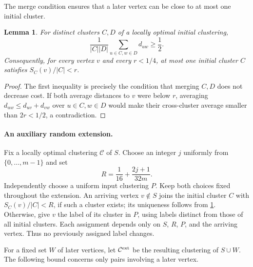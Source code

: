 \documentclass[11pt]{article}
\newtheorem{lemma}[theorem]{Lemma}
\begin{document}
The merge condition ensures that a later vertex can be close to at
most one initial cluster.

\begin{lemma}
\label{seedext:merge}
For distinct clusters $C,D$ of a locally optimal initial clustering,
\[
 \frac1{|C||D|}\sum_{u\in C,w\in D}d_{uw}\ge\frac12.
\]
Consequently, for every vertex $v$ and every $r<1/4$, at most one
initial cluster $C$ satisfies $S_C(v)/|C|<r$.
\end{lemma}
\begin{proof}
The first inequality is precisely the condition that merging $C,D$
does not decrease cost. If both average distances to $v$ were below
$r$, averaging $d_{uw}\le d_{uv}+d_{vw}$ over $u\in C,w\in D$ would
make their cross-cluster average smaller than $2r<1/2$, a contradiction.
\end{proof}

\paragraph{An auxiliary random extension.}
Fix a locally optimal clustering $\mathcal C$ of $S$. Choose an integer
$j$ uniformly from $\{0,\ldots,m-1\}$ and set
\[
 R=\frac1{16}+\frac{2j+1}{32m}.
\]
Independently choose a uniform input clustering $P$. Keep both choices
fixed throughout the extension. An arriving vertex $v\notin S$ joins
the initial cluster $C$ with $S_C(v)/|C|<R$, if such a cluster exists;
its uniqueness follows from \cref{seedext:merge}. Otherwise, give $v$
the label of its cluster in $P$, using labels distinct from those of
all initial clusters. Each assignment depends only on $S$, $R$, $P$,
and the arriving vertex. Thus no previously assigned label changes.

For a fixed set $W$ of later vertices, let $\mathcal C^{\rm ext}$ be
the resulting clustering of $S\cup W$. The following bound concerns
only pairs involving a later vertex.
\end{document}
